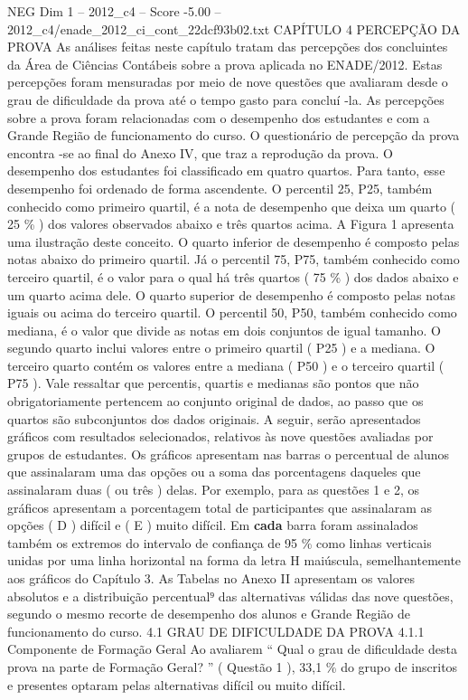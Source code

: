 \begin{textsample}{NEG Dim 1 – 2012\_c4 – Score -5.00 – 2012\_c4/enade\_2012\_ci\_cont\_22dcf93b02.txt}  \label{ex:f1_neg_080}
CAPÍTULO 4 PERCEPÇÃO DA PROVA As análises feitas neste capítulo tratam das percepções dos concluintes da Área de Ciências Contábeis sobre a prova aplicada no ENADE/2012.
Estas percepções foram mensuradas por meio de nove questões que avaliaram desde o grau de dificuldade da prova até o tempo gasto para concluí -la.
As percepções sobre a prova foram relacionadas com o desempenho dos estudantes e com a Grande Região de funcionamento do curso.
O questionário de percepção da prova encontra -se ao final do Anexo IV, que traz a reprodução da prova.
O desempenho dos estudantes foi classificado em quatro quartos.
Para tanto, esse desempenho foi ordenado de forma ascendente.
O percentil 25, P25, também conhecido como primeiro quartil, é a nota de desempenho que deixa um quarto ( 25 \% ) dos valores observados abaixo e três quartos acima.
A Figura 1 apresenta uma ilustração deste conceito.
O quarto inferior de desempenho é composto pelas notas abaixo do primeiro quartil.
Já o percentil 75, P75, também conhecido como terceiro quartil, é o valor para o qual há três quartos ( 75 \% ) dos dados abaixo e um quarto acima dele.
O quarto superior de desempenho é composto pelas notas iguais ou acima do terceiro quartil.
O percentil 50, P50, também conhecido como mediana, é o valor que divide as notas em dois conjuntos de igual tamanho.
O segundo quarto inclui valores entre o primeiro quartil ( P25 ) e a mediana.
O terceiro quarto contém os valores entre a mediana ( P50 ) e o terceiro quartil ( P75 ).
Vale ressaltar que percentis, quartis e medianas são pontos que não obrigatoriamente pertencem ao conjunto original de dados, ao passo que os quartos são subconjuntos dos dados originais.
A seguir, serão apresentados gráficos com resultados selecionados, relativos às nove questões avaliadas por grupos de estudantes.
Os gráficos apresentam nas barras o percentual de alunos que assinalaram uma das opções ou a soma das porcentagens daqueles que assinalaram duas ( ou três ) delas.
Por exemplo, para as questões 1 e 2, os gráficos apresentam a porcentagem total de participantes que assinalaram as opções ( D ) difícil e ( E ) muito difícil.
Em \textbf{cada} barra foram assinalados também os extremos do intervalo de confiança de 95 \% como linhas verticais unidas por uma linha horizontal na forma da letra H maiúscula, semelhantemente aos gráficos do Capítulo 3.
As Tabelas no Anexo II apresentam os valores absolutos e a distribuição percentual⁹ das alternativas válidas das nove questões, segundo o mesmo recorte de desempenho dos alunos e Grande Região de funcionamento do curso. 4.1 GRAU DE DIFICULDADE DA PROVA 4.1.1 Componente de Formação Geral Ao avaliarem “ Qual o grau de dificuldade desta prova na parte de Formação Geral? ” ( Questão 1 ), 33,1 \% do grupo de inscritos e presentes optaram pelas alternativas difícil ou muito difícil.

\end{textsample}
